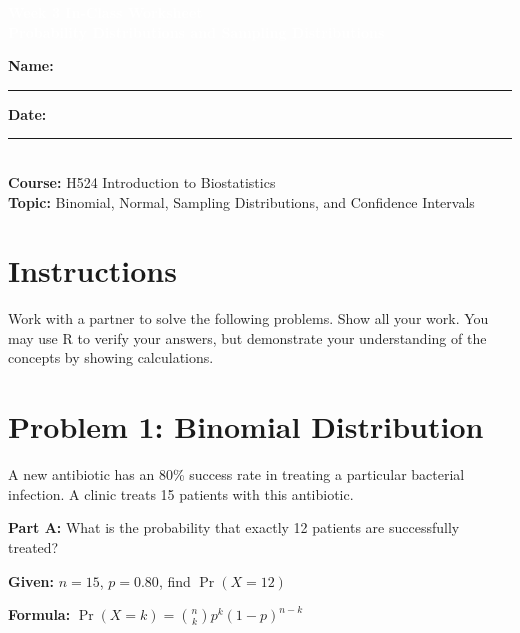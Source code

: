 \documentclass[11pt]{article}
\title{}
\author{}
\date{}
\begin{document}
\begin{tcolorbox}[colback=osaorange,colframe=black,boxrule=2pt,arc=0pt,left=6pt,right=6pt,top=10pt,bottom=10pt]
\centering
\textcolor{white}{\textbf{\Large Week 3 In-Class Worksheet}}\\
\textcolor{white}{\textbf{\large Probability Distributions and Sampling Distributions}}
\end{tcolorbox}

\vspace{8pt}

\noindent\textbf{Name:} \rule{8cm}{0.4pt} \hfill \textbf{Date:} \rule{4cm}{0.4pt}\\[0.5ex]
\textbf{Course:} H524 Introduction to Biostatistics\\
\textbf{Topic:} Binomial, Normal, Sampling Distributions, and Confidence Intervals

\vspace{8pt}

\section*{Instructions}
Work with a partner to solve the following problems. Show all your work. You may use R to verify your answers, but demonstrate your understanding of the concepts by showing calculations.

\vspace{12pt}

\section{Problem 1: Binomial Distribution}

A new antibiotic has an 80\% success rate in treating a particular bacterial infection. A clinic treats 15 patients with this antibiotic.

\vspace{6pt}

\textbf{Part A:} What is the probability that exactly 12 patients are successfully treated?

\vspace{0.3cm}

\textbf{Given:} $n = 15$, $p = 0.80$, find $\Pr(X = 12)$

\vspace{0.3cm}

\textbf{Formula:} $\Pr(X = k) = \binom{n}{k} p^k (1-p)^{n-k}$

\vspace{3.5cm}
\end{document}

